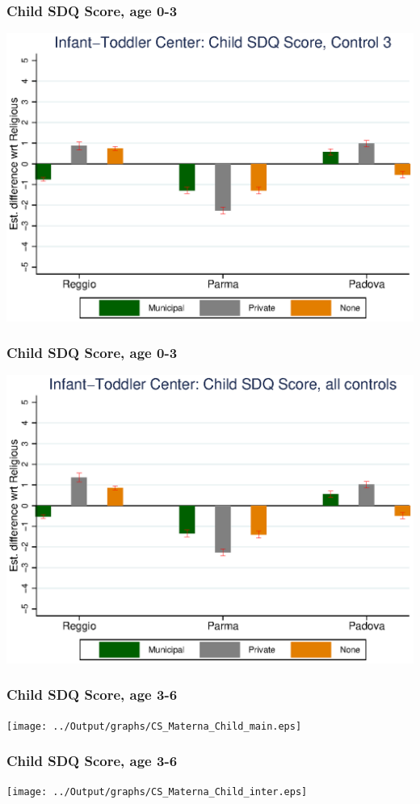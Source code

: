 \documentclass{beamer}
\begin{document}
\begin{frame}\frametitle{Child SDQ Score, age 0-3}
\center
\includegraphics[scale=0.7]{../Output/graphs/CS_Asilo_Child_right.eps}
\end{frame}

\begin{frame}\frametitle{Child SDQ Score, age 0-3}
\center
\includegraphics[scale=0.7]{../Output/graphs/CS_Asilo_Child_all.eps}
\end{frame}


\begin{frame}\frametitle{Child SDQ Score, age 3-6}
\center
\texttt{[image: ../Output/graphs/CS\_Materna\_Child\_main.eps]}
\end{frame}

\begin{frame}\frametitle{Child SDQ Score, age 3-6}
\center
\texttt{[image: ../Output/graphs/CS\_Materna\_Child\_inter.eps]}
\end{frame}
\end{document}
